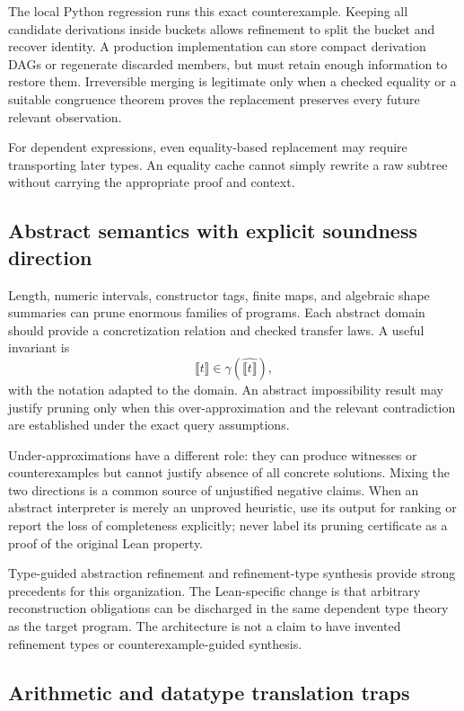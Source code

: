 \documentclass[11pt,letterpaper]{article}
\theoremstyle{definition}\newtheorem{definition}[theorem]{Definition}
\theoremstyle{remark}\newtheorem{remark}[theorem]{Remark}
\begin{document}
The local Python regression runs this exact counterexample. Keeping all
candidate derivations inside buckets allows refinement to split the bucket and
recover identity. A production implementation can store compact derivation DAGs
or regenerate discarded members, but must retain enough information to restore
them. Irreversible merging is legitimate only when a checked equality or a
suitable congruence theorem proves the replacement preserves every future
relevant observation.

For dependent expressions, even equality-based replacement may require
transporting later types. An equality cache cannot simply rewrite a raw subtree
without carrying the appropriate proof and context.

\subsection{Abstract semantics with explicit soundness direction}

Length, numeric intervals, constructor tags, finite maps, and algebraic shape
summaries can prune enormous families of programs. Each abstract domain should
provide a concretization relation and checked transfer laws. A useful invariant
is
\[
 \llbracket t\rrbracket\in\gamma(\widehat{\llbracket t\rrbracket}),
\]
with the notation adapted to the domain. An abstract impossibility result may
justify pruning only when this over-approximation and the relevant contradiction
are established under the exact query assumptions.

Under-approximations have a different role: they can produce witnesses or
counterexamples but cannot justify absence of all concrete solutions. Mixing the
two directions is a common source of unjustified negative claims. When an
abstract interpreter is merely an unproved heuristic, use its output for
ranking or report the loss of completeness explicitly; never label its pruning
certificate as a proof of the original Lean property.

Type-guided abstraction refinement and refinement-type synthesis provide strong
precedents for this organization. The Lean-specific change is that arbitrary
reconstruction obligations can be discharged in the same dependent type theory
as the target program. The architecture is not a claim to have invented
refinement types or counterexample-guided synthesis.\cite{synquid,tygar}

\subsection{Arithmetic and datatype translation traps}
\end{document}
